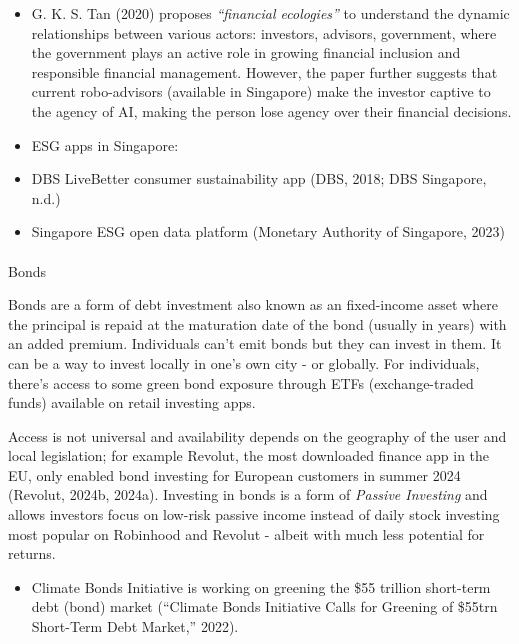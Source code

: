 \documentclass[
  letterpaper,
  DIV=11,
  numbers=noendperiod]{scrartcl}
\makeatletter
\let\oldparagraph\paragraph
\renewcommand{\paragraph}{
    \@ifstar
      \xxxParagraphStar
      \xxxParagraphNoStar
  }
\newcommand{\xxxParagraphStar}[1]{\oldparagraph*{#1}\mbox{}}
\newcommand{\xxxParagraphNoStar}[1]{\oldparagraph{#1}\mbox{}}
\providecommand{\tightlist}{%
  \setlength{\itemsep}{0pt}\setlength{\parskip}{0pt}}\usepackage{longtable,booktabs,array}
\makeatother
\begin{document}
\begin{itemize}
\item
  G. K. S. Tan (2020) proposes \emph{``financial ecologies''} to
  understand the dynamic relationships between various actors:
  investors, advisors, government, where the government plays an active
  role in growing financial inclusion and responsible financial
  management. However, the paper further suggests that current
  robo-advisors (available in Singapore) make the investor captive to
  the agency of AI, making the person lose agency over their financial
  decisions.
\item
  ESG apps in Singapore:
\item
  DBS LiveBetter consumer sustainability app (DBS, 2018; DBS Singapore,
  n.d.)
\item
  Singapore ESG open data platform (Monetary Authority of Singapore,
  2023)
\end{itemize}

\paragraph{Bonds}\label{bonds}

Bonds are a form of debt investment also known as an fixed-income asset
where the principal is repaid at the maturation date of the bond
(usually in years) with an added premium. Individuals can't emit bonds
but they can invest in them. It can be a way to invest locally in one's
own city - or globally. For individuals, there's access to some green
bond exposure through ETFs (exchange-traded funds) available on retail
investing apps.

Access is not universal and availability depends on the geography of the
user and local legislation; for example Revolut, the most downloaded
finance app in the EU, only enabled bond investing for European
customers in summer 2024 (Revolut, 2024b, 2024a). Investing in bonds is
a form of \emph{Passive Investing} and allows investors focus on
low-risk passive income instead of daily stock investing most popular on
Robinhood and Revolut - albeit with much less potential for returns.

\begin{itemize}
\tightlist
\item
  Climate Bonds Initiative is working on greening the \$55 trillion
  short-term debt (bond) market ({``Climate {Bonds Initiative} Calls for
  Greening of \$55trn Short-Term Debt Market,''} 2022).
\end{itemize}
\end{document}
